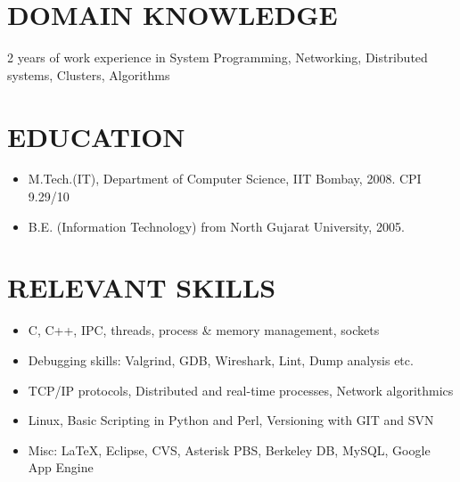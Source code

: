 \documentclass{res}
\begin{document}
\begin{resume}

					 \section{DOMAIN KNOWLEDGE}

					 2 years of work experience in System Programming, Networking, Distributed systems, Clusters, Algorithms 
					  
					  \section{EDUCATION}
					  \begin{itemize}
					  \item M.Tech.(IT), Department of Computer Science, IIT Bombay, 2008. CPI 9.29/10 
					  \item B.E. (Information Technology) from North Gujarat University, 2005. 
					  \end{itemize}

					  \section{RELEVANT SKILLS}

					  \begin{itemize}
					  \item C, C++, IPC, threads, process \& memory management, sockets
				          \item Debugging skills: Valgrind, GDB, Wireshark, Lint, Dump analysis etc.
					  \item TCP/IP protocols, Distributed and real-time processes, Network algorithmics
                                          \item Linux, Basic Scripting in Python and Perl, Versioning with GIT and SVN
					  \item Misc: \LaTeX, Eclipse, CVS, Asterisk PBS, Berkeley DB, MySQL, Google App Engine 
					  \end{itemize}


\end{resume}
\end{document}
